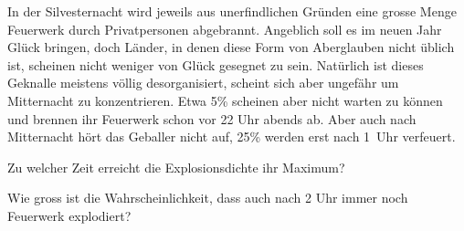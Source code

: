 In der Silvesternacht wird jeweils aus unerfindlichen Gründen eine grosse
Menge Feuerwerk durch Privatpersonen abgebrannt.
Angeblich soll es im neuen Jahr Glück bringen, doch Länder, in denen
diese Form von Aberglauben nicht üblich ist, scheinen nicht weniger
von Glück gesegnet zu sein.
Natürlich ist dieses Geknalle meistens völlig desorganisiert, scheint
sich aber ungefähr um Mitternacht zu konzentrieren.
Etwa 5\%  scheinen aber nicht warten zu können und brennen ihr
Feuerwerk schon vor 22 Uhr abends ab.
Aber auch nach Mitternacht hört das Geballer nicht auf, 25\% werden erst
nach 1~Uhr verfeuert.
\begin{teilaufgaben}
\item Zu welcher Zeit erreicht die Explosionsdichte ihr Maximum?
\item Wie gross ist die Wahrscheinlichkeit, dass auch nach 2 Uhr
immer noch Feuerwerk explodiert?
\end{teilaufgaben}

